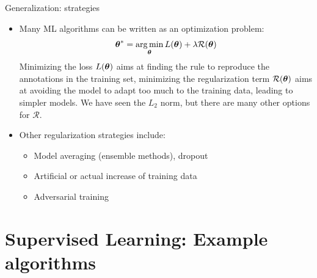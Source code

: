 \documentclass[xcolor=pdftex,dvipsnames,table]{beamer}
\begin{document}
\begin{frame}{Generalization: strategies}
\begin{itemize}
\item Many ML algorithms can be written as an optimization problem:
\begin{equation*}
\boldsymbol{\theta} ^{\ast} = \operatorname*{arg\,min}_{\boldsymbol{\theta}} L (\boldsymbol{\theta}) + \lambda \mathcal{R}(\boldsymbol{\theta})
\end{equation*}
Minimizing the loss $L (\boldsymbol{\theta})$ aims at finding the rule to reproduce the annotations in the training set, minimizing the regularization term $\mathcal{R}(\boldsymbol{\theta})$ aims at avoiding the model to adapt too much to the training data, leading to simpler models. We have seen the $L_2$ norm, but there are many other options for $\mathcal{R}$.
\item Other regularization strategies include:
\begin{itemize}
\item Model averaging (ensemble methods), dropout
\item Artificial or actual increase of training data
\item Adversarial training
\end{itemize}
\end{itemize}
\end{frame}

\section{Supervised Learning: Example algorithms}


\end{document}
